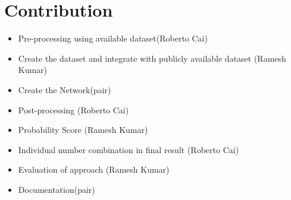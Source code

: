 \documentclass[12pt, letterpaper]{article}
\begin{document}
\section{Contribution}

\begin{itemize}
	\item Pre-processing using available dataset(Roberto Cai)
	\item Create the dataset and integrate with publicly available dataset (Ramesh Kumar)
	\item Create the Network(pair)
	\item Post-processing (Roberto Cai)
	\item Probability Score (Ramesh Kumar)
	\item Individual number combination in final result (Roberto Cai)
	\item Evaluation of approach (Ramesh Kumar)
	\item Documentation(pair)
\end{itemize}
\end{document}
